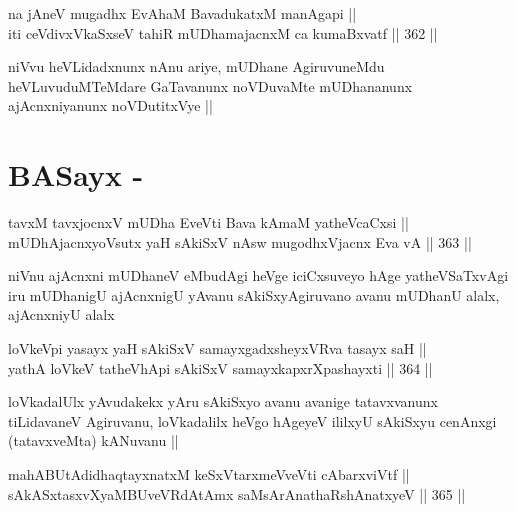 \begin{shl}
na jAneV mugadhx EvAhaM BavadukatxM manAgapi || \\
iti ceVdivxVkaSxseV tahiR mUDhamajacnxM ca kumaBxvatf ||  362 ||  
\end{shl}

\begin{artha}
niVvu heVLidadxnunx nAnu ariye, mUDhane AgiruvuneMdu heVLuvuduMTeMdare
GaTavanunx noVDuvaMte mUDhananunx ajAcnxniyanunx noVDutitxVye ||
\end{artha}

\section*{BASayx -}


\begin{shl}
tavxM tavxjocnxV mUDha EveVti Bava kAmaM yatheVcaCxsi || \\
mUDhAjacnxyoVsutx yaH sAkiSxV nAsw mugodhxV\s jacnx Eva vA ||  363 ||  
\end{shl}

\begin{artha}
niVnu ajAcnxni mUDhaneV eMbudAgi heVge iciCxsuveyo hAge yatheVSaTxvAgi
iru mUDhanigU ajAcnxnigU yAvanu sAkiSxyAgiruvano avanu mUDhanU alalx,
ajAcnxniyU alalx
\end{artha}


\begin{shl}
loVkeV\s pi yasayx yaH sAkiSxV samayxgadxsheyxVRva tasayx saH || \\
yathA loVkeV tatheVhApi sAkiSxV samayxkapxrXpashayxti ||  364 ||  
\end{shl}

\begin{artha}
loVkadalUlx yAvudakekx yAru sAkiSxyo avanu avanige tatavxvanunx
tiLidavaneV Agiruvanu, loVkadalilx heVgo hAgeyeV ililxyU sAkiSxyu
cenAnxgi (tatavxveMta) kANuvanu ||
\end{artha}

\begin{shl}
mahABUtAdidhaqtayxnatxM keSxVtarxmeVveVti cAbarxviVtf || \\
sAkASxtasxvXyaMBUveVRdAtAmx saMsArAnathaRshAnatxyeV ||  365 ||  
\end{shl}

